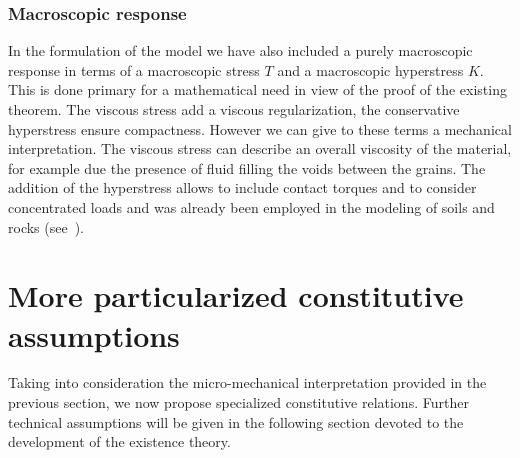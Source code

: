 \documentclass[a4paper,10pt,oneside]{amsbook}
\numberwithin{section}{chapter}
\numberwithin{equation}{chapter}
\theoremstyle{definition}
\begin{document}
\subsubsection*{Macroscopic response}

In the formulation of the model we have also included a purely macroscopic response in terms of a macroscopic stress $T$ and a macroscopic hyperstress $K$. This is done primary for a mathematical need in view of the proof of the existing theorem. The viscous stress add a viscous regularization, the conservative hyperstress ensure compactness. However we can give to these terms a mechanical interpretation. The viscous stress can describe an overall viscosity of the material, for example due the presence of fluid filling the voids between the grains. The addition of the hyperstress allows to include contact torques and to consider concentrated loads and was already been employed in the modeling of soils and rocks (see~\cite[Chapter 10]{bifurcation-geomechanics}).

\section{More particularized constitutive assumptions}
\label{sec:particular-constitutive}

Taking into consideration the micro-mechanical interpretation provided in the previous section, we now propose specialized constitutive relations. Further technical assumptions will be given in the following section devoted to the development of the existence theory.
\end{document}
